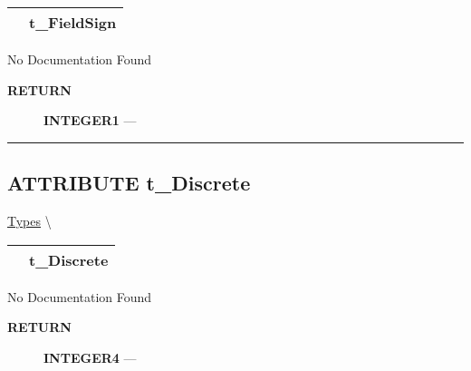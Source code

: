 {\renewcommand{\arraystretch}{1.5}
\begin{tabularx}{\textwidth}{|>{\raggedright\arraybackslash}l|X|}
\hline
\hspace{0pt}\mytexttt{\color{red} } & \textbf{t\_FieldSign} \\
\hline
\end{tabularx}
}

\par





No Documentation Found








\par
\begin{description}
\item [\colorbox{tagtype}{\color{white} \textbf{\textsf{RETURN}}}] \textbf{INTEGER1} --- 
\end{description}




\rule{\linewidth}{0.5pt}
\subsection*{\textsf{\colorbox{headtoc}{\color{white} ATTRIBUTE}
t\_Discrete}}

\hypertarget{ecldoc:ml_core.types.t_discrete}{}
\hspace{0pt} \hyperlink{ecldoc:ML_Core.Types}{Types} \textbackslash 

{\renewcommand{\arraystretch}{1.5}
\begin{tabularx}{\textwidth}{|>{\raggedright\arraybackslash}l|X|}
\hline
\hspace{0pt}\mytexttt{\color{red} } & \textbf{t\_Discrete} \\
\hline
\end{tabularx}
}

\par





No Documentation Found








\par
\begin{description}
\item [\colorbox{tagtype}{\color{white} \textbf{\textsf{RETURN}}}] \textbf{INTEGER4} --- 
\end{description}




